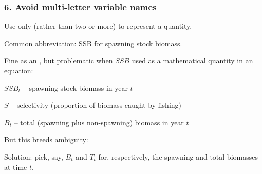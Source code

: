 \begin{frame}
\frametitle{6. Avoid multi-letter variable names}

Use only  (rather than two or more) to represent a quantity.

Common abbreviation: SSB for spawning stock biomass.

Fine as an , but problematic when $SSB$ used as a
mathematical quantity in an equation:

\bi
  \item $SSB_t$ -- spawning stock biomass in year $t$
  \item $S$ -- selectivity (proportion of biomass caught by fishing)
  \item $B_t$ -- total (spawning plus non-spawning) biomass in year $t$
\ei

But this breeds ambiguity:
\eb
\nonumber {} 
\ee
\pause


Solution: pick, say, $B_t$ and $T_t$ for, respectively, the spawning and total biomasses at time $t$.

\end{frame}


